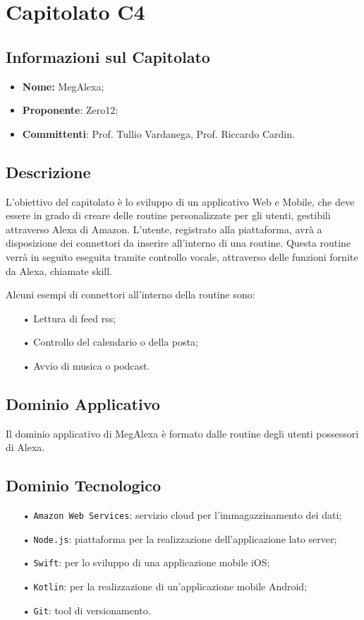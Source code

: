 \section{Capitolato C4}
\subsection{Informazioni sul Capitolato}
\begin{itemize}
	\item \textbf{Nome:} MegAlexa;
	\item \textbf{Proponente}: Zero12;
	\item \textbf{Committenti}: Prof. Tullio Vardanega, Prof. Riccardo Cardin.
\end{itemize}

\subsection{Descrizione}
L'obiettivo del capitolato è lo sviluppo di un applicativo Web e Mobile, che deve essere in grado di creare delle routine personalizzate per gli utenti, gestibili attraverso Alexa di Amazon.
L'utente, registrato alla piattaforma, avrà a disposizione dei {connettori} da inserire all'interno di una routine. Questa routine verrà in seguito eseguita tramite controllo vocale, attraverso delle funzioni fornite da Alexa, chiamate {skill}.

Alcuni esempi di connettori all'interno della routine sono:
\begin{itemize}
\item[•] Lettura di feed {rss};
\item[•] Controllo del calendario o della posta;
\item[•] Avvio di musica o podcast.
\end{itemize}

\subsection{Dominio Applicativo}
Il dominio applicativo di MegAlexa è formato dalle routine degli utenti possessori di Alexa.

\subsection{Dominio Tecnologico}
\begin{itemize}

\item[•] \texttt{Amazon Web Services}: servizio cloud per l'immagazzinamento dei dati; 
\item[•] \texttt{Node.js}: piattaforma per la realizzazione dell'applicazione lato server;
\item[•] \texttt{Swift}: per lo sviluppo di una applicazione mobile iOS;
\item[•] \texttt{Kotlin}: per la realizzazione di un'applicazione mobile Android;
\item[•] \texttt{Git}: tool di versionamento.

\end{itemize}

